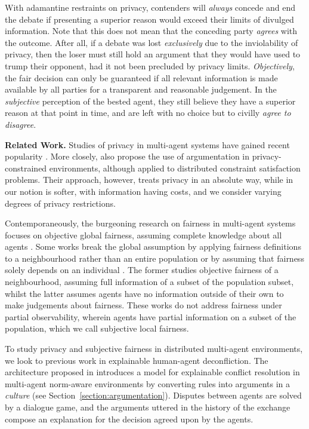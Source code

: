 \documentclass[acmsmall]{custom-arxiv}  %
\begin{document}
With adamantine restraints on privacy, contenders will \textit{always} concede and end the debate if presenting a superior reason would exceed their limits of divulged information. Note that this does not mean that the conceding party \textit{agrees} with the outcome. After all, if a debate was lost \textit{exclusively} due to the inviolability of privacy, then the loser must still hold an argument that they would have used to trump their opponent, had it not been precluded by privacy limits. \textit{Objectively}, the fair decision can only be guaranteed if all relevant information is made available by all parties for a transparent and reasonable judgement. In the \textit{subjective} perception of the bested agent, they still believe they have a superior reason at that point in time, and are left with no choice but to civilly \textit{agree to disagree}.





\textbf{Related Work.} Studies of privacy in multi-agent systems have gained recent popularity \citep{Such2014ASystems, Torreno2017CooperativeSurvey, Prorok2017Privacy-preservingSystems}. More closely, \citep{Gao2016Argumentation-basedPreserved} also propose the use of argumentation in privacy-constrained environments, although applied to distributed constraint satisfaction problems. Their approach, however, treats privacy in an absolute way, while in our notion is softer, with information having costs, and we consider varying degrees of privacy restrictions. 

Contemporaneously, the burgeoning research on fairness in multi-agent systems focuses on objective global fairness, assuming complete knowledge about all agents \citep{bin-obaid_fairness_2018}. Some works break the global assumption by applying fairness definitions to a neighbourhood rather than an entire population \citep{emelianov_price_2019} or by assuming that fairness solely depends on an individual \citep{nguyen_local_2016}. The former studies objective fairness of a neighbourhood, assuming full information of a subset of the population subset, whilst the latter assumes agents have no information outside of their own to make judgements about fairness. These works do not address fairness under partial observability, wherein agents have partial information on a subset of the population, which we call subjective local fairness.

To study privacy and subjective fairness in distributed multi-agent environments, we look to previous work in explainable human-agent deconfliction. The architecture proposed in \citep{Raymond2020Culture-BasedDeconfliction} introduces a model for explainable conflict resolution in multi-agent norm-aware environments by converting rules into arguments in a \textit{culture} (see Section~\ref{section:argumentation}). Disputes between agents are solved by a dialogue game, and the arguments uttered in the history of the exchange compose an explanation for the decision agreed upon by the agents.
\end{document}
